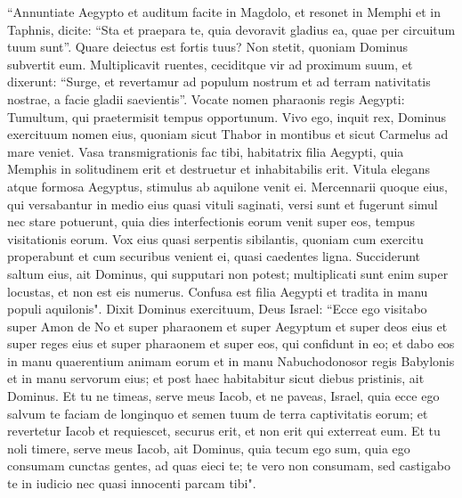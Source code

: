 \begin{biblechapter}
\verse “Annuntiate Aegypto et auditum facite in Magdolo, et resonet in Memphi et in Taphnis, dicite: “Sta et praepara te, quia devoravit gladius ea, quae per circuitum tuum sunt”. 
\verse Quare deiectus est fortis tuus? Non stetit, quoniam Dominus subvertit eum. 
\verse Multiplicavit ruentes, ceciditque vir ad proximum suum, et dixerunt: “Surge, et revertamur ad populum nostrum et ad terram nativitatis nostrae, a facie gladii saevientis”. 
\verse Vocate nomen pharaonis regis Aegypti: Tumultum, qui praetermisit tempus opportunum. 
\verse Vivo ego, inquit rex, Dominus exercituum nomen eius, quoniam sicut Thabor in montibus et sicut Carmelus ad mare veniet. 
\verse Vasa transmigrationis fac tibi, habitatrix filia Aegypti, quia Memphis in solitudinem erit et destruetur et inhabitabilis erit. 
\verse Vitula elegans atque formosa Aegyptus, stimulus ab aquilone venit ei. 
\verse Mercennarii quoque eius, qui versabantur in medio eius quasi vituli saginati, versi sunt et fugerunt simul nec stare potuerunt, quia dies interfectionis eorum venit super eos, tempus visitationis eorum. 
\verse Vox eius quasi serpentis sibilantis, quoniam cum exercitu properabunt et cum securibus venient ei, quasi caedentes ligna. 
\verse Succiderunt saltum eius, ait Dominus, qui supputari non potest; multiplicati sunt enim super locustas, et non est eis numerus. 
\verse Confusa est filia Aegypti et tradita in manu populi aquilonis". 
\verse Dixit Dominus exercituum, Deus Israel: “Ecce ego visitabo super Amon de No et super pharaonem et super Aegyptum et super deos eius et super reges eius et super pharaonem et super eos, qui confidunt in eo; 
\verse et dabo eos in manu quaerentium animam eorum et in manu Nabuchodonosor regis Babylonis et in manu servorum eius; et post haec habitabitur sicut diebus pristinis, ait Dominus. 
\verse Et tu ne timeas, serve meus Iacob, et ne paveas, Israel, quia ecce ego salvum te faciam de longinquo et semen tuum de terra captivitatis eorum; et revertetur Iacob et requiescet, securus erit, et non erit qui exterreat eum. 
\verse Et tu noli timere, serve meus Iacob, ait Dominus, quia tecum ego sum, quia ego consumam cunctas gentes, ad quas eieci te; te vero non consumam, sed castigabo te in iudicio nec quasi innocenti parcam tibi". 
\end{biblechapter}

